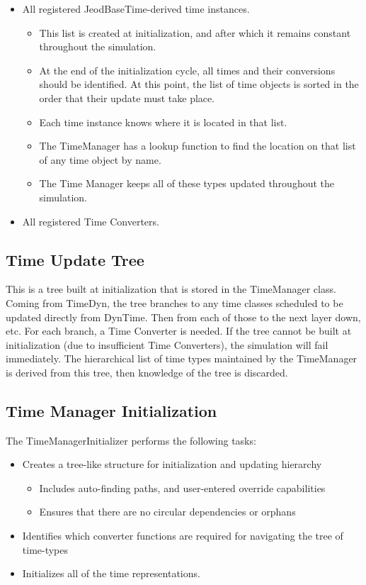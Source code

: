 \begin{itemize}
\item All registered JeodBaseTime-derived time instances.

\begin{itemize}
\item This list is created at initialization, and after which it remains 
constant throughout the simulation.
\item At the end of the initialization cycle, all times and their 
conversions should be identified. At this point, the list of time objects is 
sorted in the order that their update must take place.
\item Each time instance knows where it is located in that list.
\item The TimeManager has a lookup function to find the location on that
list of any time object by name.
\item The Time Manager keeps all of these types updated throughout the
simulation.
\end{itemize}
\item All registered Time Converters.

\end{itemize}



\subsection{Time Update Tree}
This is a tree built at initialization that is stored in the TimeManager
class.  Coming from TimeDyn, the tree branches to any time classes
scheduled to be updated directly from DynTime.  Then from each of those
to the next layer down, etc.  For each branch, a Time Converter is
needed.  If the tree cannot be built at initialization (due to
insufficient Time Converters), the simulation will fail immediately. 
The hierarchical list of time types maintained by the TimeManager is
derived from this tree, then knowledge of the tree is discarded.




\subsection{Time Manager Initialization}
The TimeManagerInitializer performs the following tasks:


\begin{itemize}
\item Creates a tree-like structure for initialization and updating
hierarchy

\begin{itemize}
\item Includes auto-finding paths, and user-entered override
capabilities
\item Ensures that there are no circular dependencies or orphans
\end{itemize}
\item Identifies which converter functions are required for navigating
the tree of time-types
\item Initializes all of the time representations.
\end{itemize}

